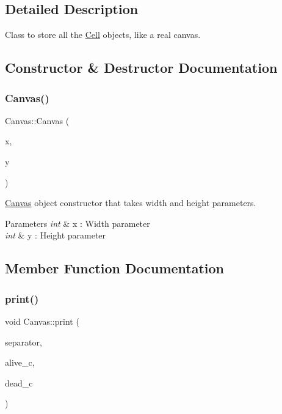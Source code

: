 \subsection{Detailed Description}
Class to store all the \mbox{\hyperlink{class_cell}{Cell}} objects, like a real canvas. 

\subsection{Constructor \& Destructor Documentation}
\mbox{\label{class_canvas_aabb8ad56107413ecd614a311079b95a3}} 
\subsubsection{\texorpdfstring{Canvas()}{Canvas()}}
{\footnotesize\ttfamily Canvas\+::\+Canvas (\begin{DoxyParamCaption}\item[{int}]{x,  }\item[{int}]{y }\end{DoxyParamCaption})}



\mbox{\hyperlink{class_canvas}{Canvas}} object constructor that takes width and height parameters. 


\begin{DoxyParams}{Parameters}
{\em int} & x \+: Width parameter \\
\hline
{\em int} & y \+: Height parameter \\
\hline
\end{DoxyParams}


\subsection{Member Function Documentation}
\mbox{\label{class_canvas_aaa8d62f6584a34128a28d33515d0c2a8}} 
\subsubsection{\texorpdfstring{print()}{print()}}
{\footnotesize\ttfamily void Canvas\+::print (\begin{DoxyParamCaption}\item[{char}]{separator,  }\item[{char}]{alive\+\_\+c,  }\item[{char}]{dead\+\_\+c }\end{DoxyParamCaption})}




